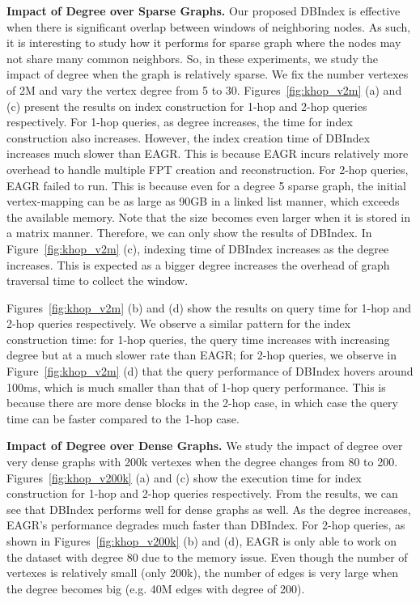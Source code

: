 \textbf{Impact of Degree over Sparse Graphs.} Our proposed DBIndex is effective when there is significant overlap between windows of neighboring nodes. As such, it is interesting to study how it performs for sparse graph where the nodes may not share many common neighbors. So, in these experiments, 
we study the impact of degree when the graph is relatively sparse.
We fix the number vertexes of 2M and vary the vertex degree from 5 to 30. 
Figures~\ref{fig:khop_v2m} (a) and (c) present the results 
on index construction for 1-hop and 2-hop queries respectively. 
For 1-hop queries, as degree increases, the time for index
construction also increases. 
However, the index creation time of DBIndex increases much 
slower than EAGR. This is because EAGR incurs relatively more 
overhead to handle multiple FPT creation and reconstruction. 
For 2-hop queries, EAGR failed to run. This is because even for 
a degree 5 sparse graph, the initial vertex-mapping can be as large 
as 90GB in a linked list manner, which exceeds the available memory. 
Note that the size becomes even larger when it is stored in a matrix manner.
Therefore, we can only show the results of DBIndex. 
In Figure~\ref{fig:khop_v2m} (c), indexing time of DBIndex increases as the 
degree increases. This is expected as a bigger degree  
increases the overhead of graph traversal time to collect the window. 


Figures~\ref{fig:khop_v2m} (b) and (d)
show the results on query time 
for 1-hop and 2-hop queries respectively. 
We observe a similar pattern for the index construction time:
for 1-hop queries, the query time increases with increasing degree
but at a much slower rate than EAGR; for 2-hop queries, we observe in Figure~\ref{fig:khop_v2m} (d) that the
query performance of DBIndex hovers around 100ms, which is much 
smaller than that of 1-hop query performance. 
This is because there are more dense blocks in the 2-hop case, 
in which case the query time can be faster compared to the 1-hop case. 

\textbf{Impact of Degree over Dense Graphs.} We study the 
impact of degree over very dense graphs with 200k vertexes 
when the degree changes from 80 to 200. 
Figures~\ref{fig:khop_v200k} (a) and (c) show
the execution time for index construction 
for 1-hop and 2-hop queries respectively. From the results, 
we can see that DBIndex performs well for dense graphs as well. 
As the degree increases, EAGR's performance degrades much faster than DBIndex. For 2-hop queries,
as shown in Figures~\ref{fig:khop_v200k} (b) and (d), EAGR is only able to work on 
the dataset with degree 80 due to the memory issue. 
Even though the number of vertexes is relatively small (only 200k), 
the number of edges is very large when the degree becomes big 
(e.g. 40M edges with degree of 200). 

